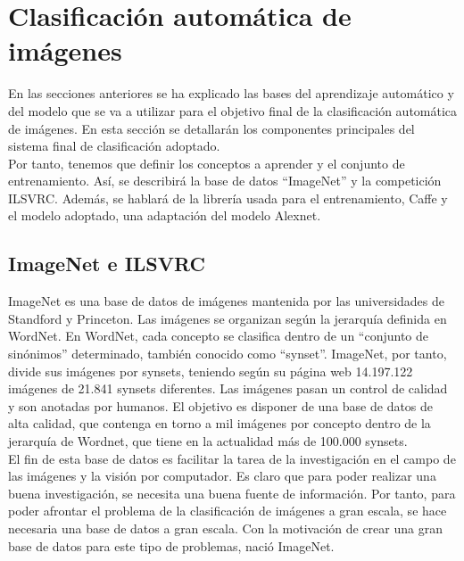 \section{Clasificación automática de imágenes}

En las secciones anteriores se ha explicado las bases del aprendizaje automático y del modelo que se va a utilizar para el objetivo final de la clasificación automática de imágenes. En esta sección se detallarán los componentes principales del sistema final de clasificación adoptado.\\

Por tanto, tenemos que definir los conceptos a aprender y el conjunto de entrenamiento. Así, se describirá la base de datos ``ImageNet'' y la competición ILSVRC. Además, se hablará de la librería usada para el entrenamiento, Caffe  y el modelo adoptado, una adaptación del modelo Alexnet.\\

\subsection{ImageNet e ILSVRC}

ImageNet es una base de datos de imágenes  mantenida por las universidades de Standford y Princeton. Las imágenes se organizan según la jerarquía definida en WordNet. En WordNet, cada concepto se clasifica dentro de un ``conjunto de sinónimos'' determinado, también conocido como ``synset''. ImageNet, por tanto, divide sus imágenes por synsets, teniendo según su página web 14.197.122 imágenes de 21.841 synsets diferentes. Las imágenes pasan un control de calidad y son anotadas por humanos. El objetivo es disponer de una base de datos de alta calidad, que contenga en torno a mil imágenes por concepto dentro de la jerarquía de Wordnet, que tiene en la actualidad más de 100.000 synsets.\\

El fin de esta base de datos es facilitar la tarea de la investigación en el campo de las imágenes y la visión por computador. Es claro que para poder realizar una buena investigación, se necesita una buena fuente de información. Por tanto, para poder afrontar el problema de la clasificación de imágenes a gran escala, se hace necesaria una base de datos a gran escala. Con la motivación de crear una gran base de datos para este tipo de problemas, nació ImageNet.\\

